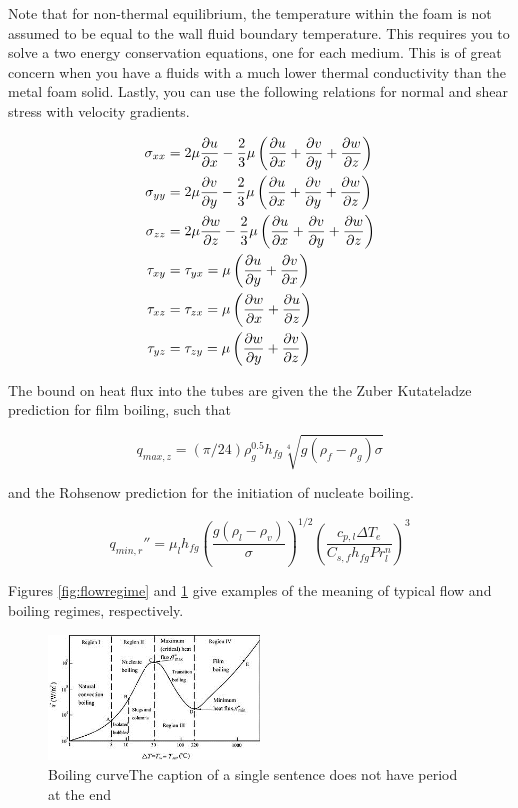 \documentclass[asme2ejs.tex]{subfiles}
\begin{document}
Note that for non-thermal equilibrium, the temperature within the foam is not assumed to be equal to the wall fluid boundary temperature. 
This requires you to solve a two energy conservation equations, one for each medium. 
This is of great concern when you have a fluids with a much lower thermal conductivity than the metal foam solid.
Lastly, you can use the following relations for normal and shear stress with velocity gradients.

\begin{align}
\sigma_{xx} &= 2\mu  \frac{\partial u}{\partial x}  - \frac{2}{3} \mu \left(  \frac{\partial u}{\partial x}  +  \frac{\partial v}{\partial y}  +  \frac{\partial w}{\partial z}   \right) \\
\sigma_{yy} &= 2 \mu  \frac{\partial v}{\partial y}  - \frac{2}{3} \mu \left(  \frac{\partial u}{\partial x}  +  \frac{\partial v}{\partial y}  +  \frac{\partial w}{\partial z}   \right) \\
\sigma_{zz} &= 2 \mu  \frac{\partial w}{\partial z}  - \frac{2}{3} \mu \left(  \frac{\partial u}{\partial x}  +  \frac{\partial v}{\partial y}  +  \frac{\partial w}{\partial z}  \right) \\
\tau_{xy} &= \tau_{yx} = \mu \left(  \frac{\partial u}{\partial y}  +  \frac{\partial v}{\partial x}  \right) \\
\tau_{xz} &= \tau_{zx} = \mu \left(  \frac{\partial w}{\partial x}  +  \frac{\partial u}{\partial z}  \right) \\
\tau_{yz} &= \tau_{zy} = \mu \left(  \frac{\partial w}{\partial y}  +  \frac{\partial v}{\partial z}  \right)
\end{align}

The bound on heat flux into the tubes are given the the Zuber Kutateladze prediction for film boiling, such that

\begin{equation}
q_{max,z} = (\pi/24)\rho_g^{0.5} h_{fg} \sqrt[4]{g (\rho_{f} - \rho_{g}) \sigma}
\end{equation}

and the Rohsenow prediction for the initiation of nucleate boiling. 
\cite{Incropera}

\begin{equation}
q_{min,r}'' = \mu_l h_{fg} \left( \frac{g (\rho_l - \rho_v)}{\sigma} \right)^{1/2} \left( \frac{c_{p,l} \Delta T_e}{C_{s,f} h_{fg} Pr_l^n} \right)^3
\end{equation}

Figures \ref{fig:flowregime} and \ref{fig:boilingregime} give examples of the meaning of typical flow and boiling regimes, respectively.

\begin{figure}
\centering
\includegraphics[width=0.5\textwidth]{./figure/400px-Boiling}
\caption{Boiling curveThe caption of a single sentence does not have period at the end}
\label{fig:boilingregime}
\end{figure}
\end{document}

